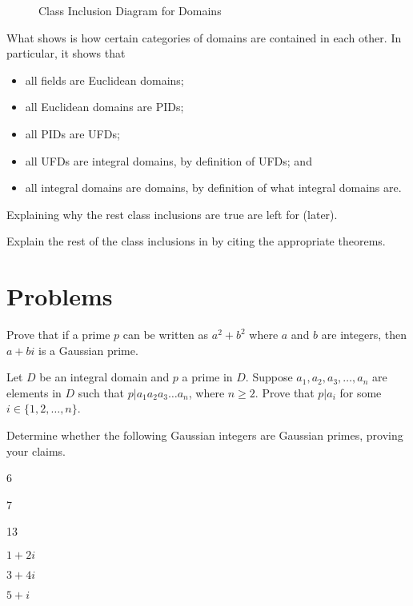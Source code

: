\begin{figure}[h]
    \centering
    \caption{Class Inclusion Diagram for Domains}\label{figure-domain-class-inclusion}
\end{figure}

What  shows is how certain categories of domains are contained in each other. In particular, it shows that
\begin{itemize}
    \item all fields are Euclidean domains;
    \item all Euclidean domains are PIDs;
    \item all PIDs are UFDs;
    \item all UFDs are integral domains, by definition of UFDs; and
    \item all integral domains are domains, by definition of what integral domains are.
\end{itemize}
Explaining why the rest class inclusions are true are left for  (later).

\begin{exercise}\label{exercise-domain-class-inclusion}
    Explain the rest of the class inclusions in  by citing the appropriate theorems.
\end{exercise}

\newpage

\section{Problems}
\begin{problem}
    Prove that if a prime $p$ can be written as $a^2+b^2$ where $a$ and $b$ are integers, then $a+bi$ is a Gaussian prime.
\end{problem}

\begin{problem}\label{problem-prime-element-divides-some-element-in-product}
    Let $D$ be an integral domain and $p$ a prime in $D$. Suppose $a_1, a_2, a_3, \dots, a_n$ are elements in $D$ such that $p \vert a_1a_2a_3\dots a_n$, where $n \geq 2$. Prove that $p \vert a_i$ for some $i \in \{1, 2, \dots, n\}$.
\end{problem}

\begin{problem}
    Determine whether the following Gaussian integers are Gaussian primes, proving your claims.
    \begin{multicols}{3}
        \begin{partquestions}{\alph*}
            \item 6
            \item 7
            \item 13
            \item $1+2i$
            \item $3+4i$
            \item $5+i$
        \end{partquestions}
    \end{multicols}
\end{problem}

